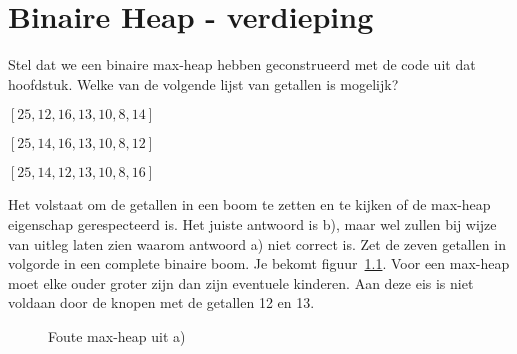 \chapter{Binaire Heap - verdieping}


\begin{oef}
\papier Stel dat we een binaire max-heap hebben geconstrueerd met de code uit dat hoofdstuk.
Welke van de volgende lijst van getallen is mogelijk?
\begin{oefenumerate}
\item $[25, 12, 16, 13, 10, 8, 14]$
\item $[25, 14, 16, 13, 10, 8, 12]$
\item $[25, 14, 12, 13, 10, 8, 16]$
\end{oefenumerate}
\begin{opl}
Het volstaat om de getallen in een boom te zetten en te kijken of de max-heap eigenschap gerespecteerd is. Het juiste antwoord is b), maar wel zullen bij wijze van uitleg laten zien waarom antwoord a) niet correct is. Zet de zeven getallen in volgorde in een complete binaire boom. Je bekomt figuur~\ref{fig:foutemaxheap}. Voor een max-heap moet elke ouder groter zijn dan zijn eventuele kinderen. Aan deze eis is niet voldaan door de knopen met de getallen 12 en 13.
\begin{figure}[htbp]
    \centering
{}
\caption{Foute max-heap uit a)}
    \label{fig:foutemaxheap}
\end{figure}
\end{opl}

\end{oef}



